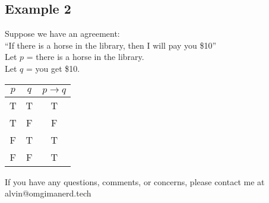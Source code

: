 \documentclass[letterpaper, 12pt]{math}
\begin{document}
\subsection*{Example 2}
Suppose we have an agreement: \\
``If there is a horse in the library, then I will pay you \$10'' \\
Let \( p \) = there is a horse in the library. \\
Let \( q \) = you get \$10.
\begin{center}
  \begin{tabular}{|c|c|c|}
    \hline
    \( p \) & \( q \) & \( p \to q \) \\ \hline
    T       & T       & T \\ \hline
    T       & F       & F \\ \hline
    F       & T       & T \\ \hline
    F       & F       & T \\ \hline
  \end{tabular}
\end{center}

\begin{center}
  If you have any questions, comments, or concerns, please contact me at
  alvin@omgimanerd.tech
\end{center}
\end{document}
